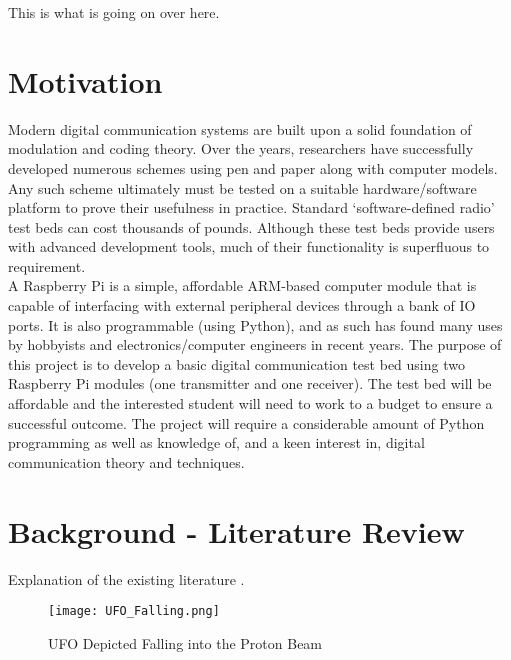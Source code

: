 \documentclass[../main.tex]{subfiles}
\begin{document}
This is what is going on over here.


\section{Motivation}
Modern digital communication systems are built upon a solid foundation of modulation and coding theory.
Over the years, researchers have successfully developed numerous schemes using pen and paper along with computer models.
Any such scheme ultimately must be tested on a suitable hardware/software platform to prove their usefulness in practice.
Standard ‘software-defined radio’ test beds can cost thousands of pounds.
Although these test beds provide users with advanced development tools, much of their functionality is superfluous to requirement.\\

A Raspberry Pi is a simple, affordable ARM-based computer module that is capable of interfacing with external peripheral devices through a bank of IO ports.
It is also programmable (using Python), and as such has found many uses by hobbyists and electronics/computer engineers in recent years.
The purpose of this project is to develop a basic digital communication test bed using two Raspberry Pi modules (one transmitter and one receiver).
The test bed will be affordable and the interested student will need to work to a budget to ensure a successful outcome.
The project will require a considerable amount of Python programming as well as knowledge of, and a keen interest in, digital communication theory and techniques.


\section{Background - Literature Review}
Explanation of the existing literature \cite{DhirNIPS2017}.

\begin{figure}[ht]
	\centering
	\texttt{[image: UFO\_Falling.png]}
	\caption{UFO Depicted Falling into the Proton Beam}
\end{figure}
\end{document}

